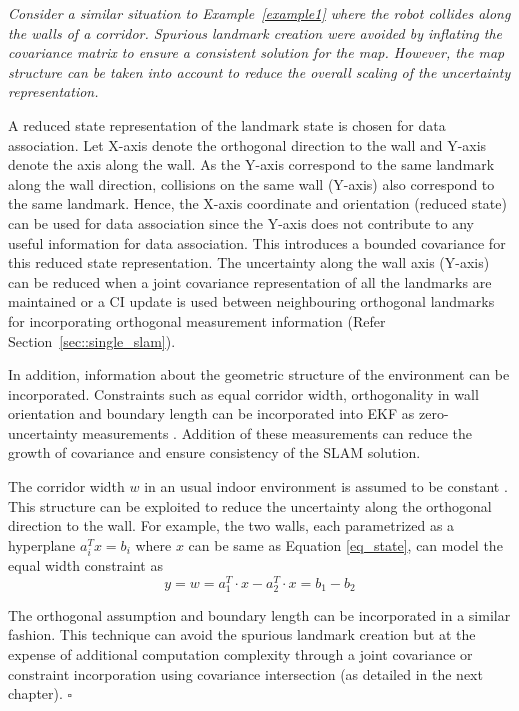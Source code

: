 \begin{exmp} {\it Consider a similar situation to Example~\ref{example1} where the robot collides along the walls of a corridor. Spurious landmark creation were avoided by inflating the covariance matrix to ensure a consistent solution for the map. However, the map structure can be taken into account to reduce the overall scaling of the uncertainty representation.} 

\qquad A reduced state representation of the landmark state is chosen for data association. Let X-axis denote the orthogonal direction to the wall and Y-axis denote the axis along the wall. As the Y-axis correspond to the same landmark along the wall direction, collisions on the same wall (Y-axis) also correspond to the same landmark. Hence, the X-axis coordinate and orientation (reduced state) can be used for data association since the Y-axis does not contribute to any useful information for data association. This introduces a bounded covariance for this reduced state representation. The uncertainty along the wall axis (Y-axis) can be reduced when a joint covariance representation of all the landmarks are maintained or a \acf{CI} update is used between neighbouring orthogonal landmarks for incorporating orthogonal measurement information (Refer Section~\ref{sec::single_slam}).

In addition, information about the geometric structure of the environment can be incorporated. Constraints such as equal corridor width, orthogonality in wall orientation and boundary length can be incorporated into EKF as zero-uncertainty measurements \cite{newman1999structure}. Addition of these measurements can reduce the growth of covariance and ensure consistency of the SLAM solution.

The corridor width $w$ in an usual indoor environment is assumed to be constant \cite{jensfelt2001approaches}. This structure can be exploited to reduce the uncertainty along the orthogonal direction to the wall. For example, the two walls, each parametrized as a hyperplane $a_i^Tx=b_i$ where $x$ can be same as Equation \ref{eq_state}, can model the equal width constraint as
\begin{equation}
y = w = a_1^T\cdot x-a_2^T\cdot x = b_1-b_2 
\end{equation}

The orthogonal assumption and boundary length can be incorporated in a similar fashion. This technique can avoid the spurious landmark creation but at the expense of additional computation complexity through a joint covariance or constraint incorporation using covariance intersection (as detailed in the next chapter). \hfill $\square$
\label{example2}
\end{exmp}


